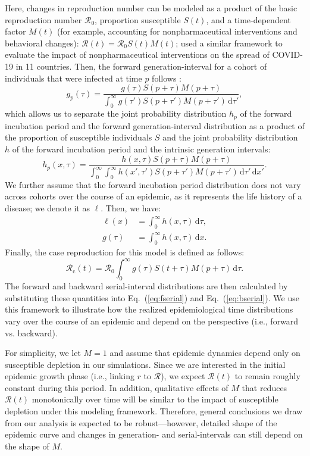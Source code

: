 \documentclass[12pt]{article}
\newcommand{\eref}[1]{Eq.~(\ref{eq:#1})}
\newcommand{\Rx}[1]{\ensuremath{{\mathcal R}_{#1}}\xspace}
\newcommand{\Ro}{\Rx{0}}
\newcommand{\Rc}{\Rx{\mathrm{c}}}
\newcommand{\RR}{\ensuremath{{\mathcal R}}\xspace}
\newcommand{\dd}[1]{\ensuremath{\, \mathrm{d}#1}}
\newcommand{\dtau}{\dd{\tau}}
\newcommand{\dx}{\dd{x}}
\newcommand{\psymp}{\ensuremath{p}} %
\newcommand{\gdist}{g} %
\newcommand{\idist}{\ell} %
\begin{document}
Here, changes in reproduction number can be modeled as a product of the basic reproduction number $\Ro$, proportion susceptible $S(t)$, and a time-dependent factor $M(t)$ (for example, accounting for nonpharmaceutical interventions and behavioral changes): $\RR(t) = \Ro S(t) M(t)$;
\cite{flaxman2020estimating} used a similar framework to evaluate the impact of nonpharmaceutical interventions on the spread of COVID-19 in 11 countries.
Then, the forward generation-interval for a cohort of individuals that were infected at time $\psymp$ follows \citep{champredon2015intrinsic}:
\begin{equation}
\gdist_\psymp (\tau) = \frac{ \gdist(\tau) S(\psymp + \tau) M(\psymp + \tau) }{\int_0^\infty \gdist(\tau') S(\psymp + \tau') M(\psymp + \tau') \dtau'},
\end{equation}
which allows us to separate the joint probability distribution $h_\psymp$ of the forward incubation period and the forward generation-interval distribution as a product of the proportion of susceptible individuals $S$ and the joint probability distribution $h$ of the forward incubation period and the intrinsic generation intervals:
\begin{equation}
h_\psymp (x, \tau) = \frac{h(x, \tau) S(\psymp + \tau) M(\psymp + \tau)}{\int_0^\infty \int_0^\infty h(x', \tau') S(\psymp + \tau') M(\psymp + \tau') \dtau' \dx'}.
\end{equation}
We further assume that the forward incubation period distribution does
not vary across cohorts over the course of an epidemic, as it
represents the life history of a disease; we denote it as $\idist$.
Then, we have:
\begin{align}
\idist(x) &= \int_0^\infty h(x, \tau) \dtau\nonumber,\\
\gdist(\tau) &= \int_0^\infty h(x, \tau) \dx.
\label{eq:marginal}
\end{align}
Finally, the case reproduction for this model is defined as follows:
\begin{equation}
\Rc(t) = \Ro \int_0^\infty \gdist(\tau) S(t+\tau) M(\psymp + \tau) \dtau.
\end{equation}
The forward and backward serial-interval distributions are then calculated by substituting these quantities into \eref{fserial} and \eref{bserial}.
We use this framework to illustrate how the realized epidemiological time distributions vary over the course of an epidemic and depend on the perspective (i.e., forward vs. backward).

For simplicity, we let $M = 1$ and assume that epidemic dynamics depend only on susceptible depletion in our simulations.
Since we are interested in the initial epidemic growth phase (i.e., linking $r$ to \RR), we expect $\RR(t)$ to remain roughly constant during this period.
In addition, qualitative effects of $M$ that reduces $\RR(t)$ monotonically over time will be similar to the impact of susceptible depletion under this modeling framework. 
Therefore, general conclusions we draw from our analysis is expected to be robust---however, detailed shape of the epidemic curve and changes in generation- and serial-intervals can still depend on the shape of $M$.
\end{document}
